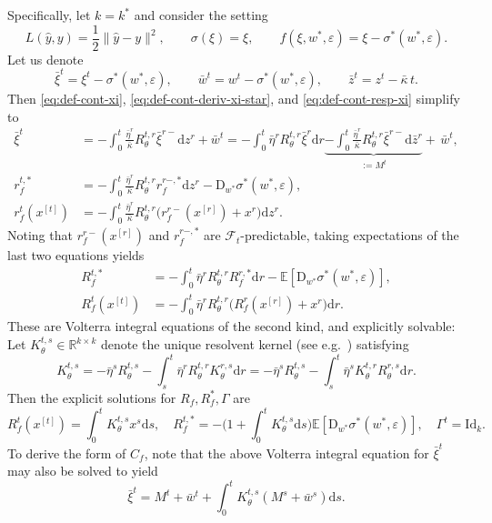 \documentclass[11pt,letterpaper,reqno]{amsart}
\theoremstyle{definition}
\def\eps{\varepsilon}
\def\d{\mathrm{d}}
\def\D{\mathrm{D}}
\def\E{\mathbb{E}}
\def\R{\mathbb{R}}
\def\Id{\mathrm{Id}}
\def\cF{\mathcal{F}}
\newcommand{\norm}[1]{\|#1\|}
\begin{document}
Specifically, let $k=k^*$ and consider the setting
\[L(\hat y,y) = \frac{1}{2} \norm{\hat y - y}^2, \qquad \sigma(\xi) = \xi,
\qquad f(\xi, w^*, \eps) = \xi - \sigma^*(w^*, \eps).\]
Let us denote
\[\bar \xi^t=\xi^t-\sigma^*(w^*,\eps),
\qquad \bar w^t=w^t-\sigma^*(w^*,\eps),
\qquad \bar z^t=z^t-\bar\kappa\,t.\]
Then \eqref{eq:def-cont-xi}, \eqref{eq:def-cont-deriv-xi-star}, and
\eqref{eq:def-cont-resp-xi} simplify to
\begin{align*}
\bar \xi^t&={-}\int_0^t \frac{\bar\eta^r}{\bar\kappa} R_\theta^{t,r} \bar
\xi^{r-}\d z^r+\bar w^t
={-}\int_0^t {\bar\eta^r} R_\theta^{t,r} \bar \xi^r \d r
\underbrace{-\int_0^t \frac{\bar\eta^r}{\bar\kappa} R_\theta^{t,r}
\bar \xi^{r-}\d \bar z^r}_{:=M^t} +\,\bar w^t,\\
r_f^{t,*}&=-\int_0^t \frac{\bar\eta^r}{\bar\kappa}
R_\theta^{t,r}r_f^{r-,*}\d z^r-\D_{w^*}\sigma^*(w^*,\eps),\\
r_f^t(x^{[t]})&={-} \int_0^t \frac{\bar\eta^r}{\bar\kappa}
R_\theta^{t,r}\big(r_f^{r-}(x^{[r]})+x^r\big)\d z^r.
\end{align*}
Noting that $r_f^{r-}(x^{[r]})$ and $r_f^{r-,*}$ are $\cF_t$-predictable,
taking expectations of the last two equations yields
\begin{align*}
R_f^{t,*}&={-}\int_0^t \bar \eta^r R_\theta^{t,r}
R_f^{r,*} \d r-\E[\D_{w^*} \sigma^*(w^*,\eps)],\\
R_f^t(x^{[t]})&={-} \int_0^t {\bar\eta^r}
R_\theta^{t,r}\big(R_f^{r}(x^{[r]})+x^{r}\big)\d r.
\end{align*}
These are Volterra integral equations of the second kind, and explicitly
solvable: Let $K_\theta^{t,s} \in \R^{k \times k}$
denote the unique resolvent kernel (see e.g.~\cite[Chap 2]{brunner2004collocation}) satisfying
\begin{equation}\label{eq:Volterra-Rt-resolvent}
K_\theta^{t,s} = -{\bar\eta^s} R_\theta^{t,s} - \int_s^t {\bar\eta^r} R_\theta^{t,r} K_\theta^{r,s} \d r
={-}\bar\eta^s R_\theta^{t,s}-\int_s^t \bar\eta^s K_\theta^{t,r}
R_\theta^{r,s}\d r.
\end{equation}
Then the explicit solutions for $R_f,R_f^*,\Gamma$ are
\begin{equation}\label{eq:Rf-linear}
R_f^t(x^{[t]}) = \int_0^t K_\theta^{t,s} x^s \d s,
\quad
R_f^{t,*}=-\bigg(1 + \int_0^t K_\theta^{t,s} \d
s\bigg)\E[\D_{w^*}\sigma^*(w^*,\eps)],
\quad \Gamma^t=\Id_k.
\end{equation}
To derive the form of $C_f$, note that the above Volterra integral equation
for $\bar\xi^t$ may also be solved to yield
\begin{equation}\label{eq:xiexplicit}
\bar\xi^t = M^t + \bar w^t + \int_0^t K_\theta^{t,s} (M^s + \bar w^s) \d s.
\end{equation}
\end{document}
